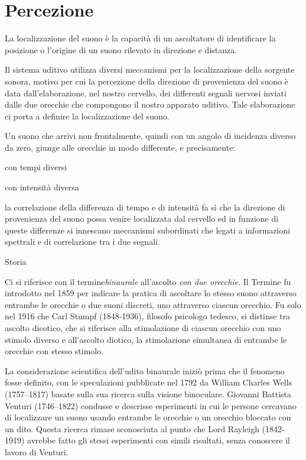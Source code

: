 \section{Percezione}

La localizzazione del suono è la capacità di un ascoltatore di identificare la
posizione o l'origine di un suono rilevato in direzione e distanza.

Il sistema uditivo utilizza diversi meccanismi per la localizzazione della
sorgente sonora, motivo per cui la percezione della direzione di provenienza del
suono è data dall’elaborazione, nel nostro cervello, dei differenti segnali
nervosi inviati dalle due orecchie che compongono il nostro apparato uditivo.
Tale elaborazione ci porta a definire la localizzazione del suono.

Un suono che arrivi non frontalmente, quindi con un angolo di incidenza
diverso da zero, giunge alle orecchie in modo differente, e precisamente:

\begin{compactitem}
\item con tempi diversi
\item con intensità diversa
\end{compactitem}

la correlazione della differenza di tempo e di intensità fa sì che la
direzione di provenienza del suono possa venire localizzata dal cervello ed in
funzione di queste differenze si innescano meccanismi subordinati che legati a
informazioni spettrali e di correlazione tra i due segnali.

Storia

Ci si riferisce con il termine\emph{binaurale} all'ascolto \emph{con due orecchie}.
Il Termine fu introdotto nel 1859 per indicare la pratica di ascoltare lo stesso
suono attraverso entrambe le orecchie o due suoni discreti, uno attraverso
ciascun orecchio. Fu solo nel 1916 che Carl Stumpf (1848-1936), filosofo
psicologo tedesco, si distinse tra ascolto dicotico, che si riferisce alla
stimolazione di ciascun orecchio con uno stimolo diverso e all'ascolto
diotico, la stimolazione simultanea di entrambe le orecchie con stesso stimolo.

La considerazione scientifica dell'udito binaurale iniziò prima che il fenomeno
fosse definito, con le speculazioni pubblicate nel 1792 da William Charles
Wells (1757–1817) basate sulla sua ricerca sulla visione binoculare.
Giovanni Battista Venturi (1746–1822) condusse e descrisse esperimenti in cui
le persone cercavano di localizzare un suono usando entrambe le orecchie o un
orecchio bloccato con un dito. Questa ricerca rimase sconosciuta al punto che
Lord Rayleigh (1842-1919) avrebbe fatto gli stessi esperimenti con simili
risultati, senza conoscere il lavoro di Venturi.

